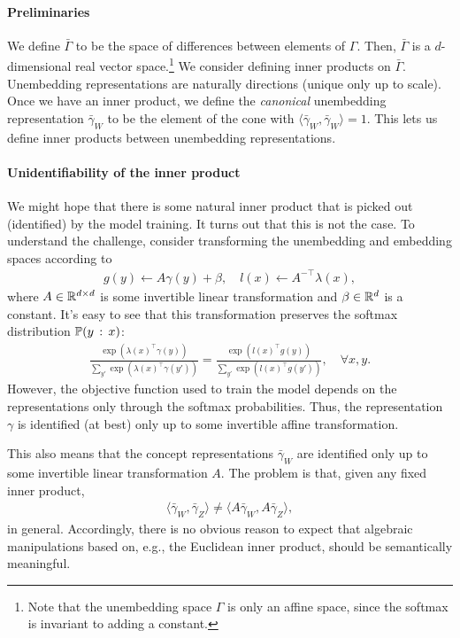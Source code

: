 \documentclass{article}
\theoremstyle{plain}
\theoremstyle{definition}
\theoremstyle{remark}
\newcommand{\ip}[2]{\langle #1,#2\rangle}
\begin{document}
\paragraph*{Preliminaries}
We define $\bar{\Gamma}$ to be the space of differences between elements of $\Gamma$.
Then, $\bar{\Gamma}$ is a $d$-dimensional real vector space.\footnote{Note that the unembedding space $\Gamma$ is only an affine space, since the softmax is invariant to adding a constant.}
We consider defining inner products on $\bar{\Gamma}$.
Unembedding representations are naturally directions (unique only up to scale).
Once we have an inner product, we define the \emph{canonical} unembedding representation $\bar{\gamma}_W$ to be the element of the cone with $\ip{\bar\gamma_W}{\bar\gamma_W} = 1$.
This lets us define inner products between unembedding representations.

\paragraph*{Unidentifiability of the inner product}
We might hope that there is some natural inner product that is picked out (identified) by the model training.
It turns out that this is not the case.
To understand the challenge, consider transforming the unembedding and embedding spaces according to
\begin{align}
    g(y) \leftarrow A \gamma(y) + \beta, \quad l(x) \leftarrow A^{-\top} \lambda(x),\label{eq:transform}
\end{align}
where $A \in \mathbb{R}^{d\times d}$ is some invertible linear transformation and $\beta \in \mathbb{R}^d$ is a constant.
It's easy to see that this transformation preserves the softmax distribution $\Pr(y \given x)$:
\begin{align*}
    \frac{\exp(\lambda(x)^\top \gamma(y))}{\sum_{y'}\exp(\lambda(x)^\top \gamma(y'))} = \frac{\exp(l(x)^\top g(y))}{\sum_{y'}\exp(l(x)^\top g(y'))}, \quad \forall x,y.
\end{align*}
However, the objective function used to train the model depends on the representations only through the softmax probabilities. 
Thus, the representation $\gamma$ is identified (at best) only up to some invertible affine transformation. 

This also means that the concept representations $\bar{\gamma}_W$ are identified only up to some invertible linear transformation $A$.
The problem is that, given any fixed inner product,
\begin{align*}
    \ip{\bar{\gamma}_W}{\bar{\gamma}_Z} \neq \ip{A\bar{\gamma}_W}{A\bar{\gamma}_Z},
\end{align*}
in general.
Accordingly, there is no obvious reason to expect that algebraic manipulations based on, e.g., the Euclidean inner product, should be semantically meaningful.
\end{document}
